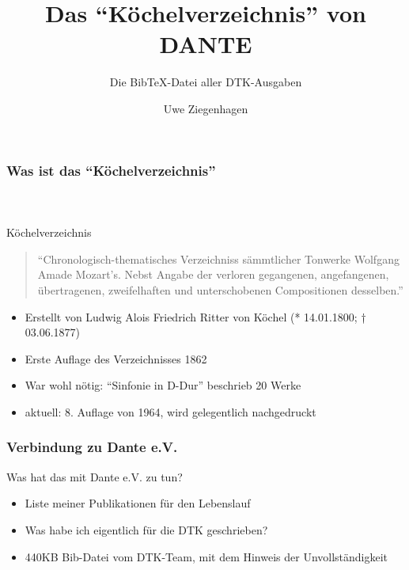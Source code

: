 \documentclass[ngerman]{beamer}
\author{Uwe Ziegenhagen}
\title{Das \enquote{Köchelverzeichnis} von DANTE}
\subtitle{Die Bib\TeX-Datei aller DTK-Ausgaben}
\begin{document}
\begin{frame}

\maketitle

\end{frame}

\begin{frame}
\frametitle{Was ist das \enquote{Köchelverzeichnis}}
\framesubtitle{~}

Köchelverzeichnis

\begin{quote}
\enquote{Chronologisch-thematisches Verzeichniss sämmtlicher Tonwerke Wolfgang Amade Mozart’s. Nebst Angabe der verloren gegangenen, angefangenen, übertragenen, zweifelhaften und unterschobenen Compositionen desselben.}
\end{quote}

\begin{itemize}
	\item Erstellt von Ludwig Alois Friedrich Ritter von Köchel \newline (* 14.01.1800; † 03.06.1877)
	\item Erste Auflage des Verzeichnisses 1862
	\item War wohl nötig: \enquote{Sinfonie in D-Dur} beschrieb 20 Werke
	\item aktuell: 8. Auflage von 1964, wird gelegentlich nachgedruckt
	\end{itemize}


\end{frame}


\begin{frame}
\frametitle{Verbindung zu Dante e.V.}

Was hat das mit Dante e.V. zu tun?

\begin{itemize}
\item Liste meiner Publikationen für den Lebenslauf
\item Was habe ich eigentlich für die DTK geschrieben?
\item 440KB Bib-Datei vom DTK-Team, mit dem Hinweis der Unvollständigkeit
\end{itemize}
\end{frame}
\end{document}
